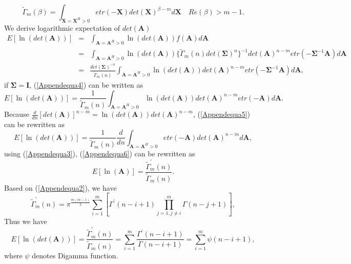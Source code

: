 \documentclass[12pt, draftclsnofoot, onecolumn]{IEEEtran}
\begin{document}
\begin{equation}
\tilde{\Gamma}_{m}(\beta)=\int_{\mathbf{X}=\mathbf{X}^{H}>0}etr(-\mathbf{X})det(\mathbf{X})^{\beta-m}d
\mathbf{X} \quad Re(\beta)>m-1.
\label{Appendequa3}
\end{equation}
We derive logarithmic expectation of $det(\mathbf{A})$
\begin{eqnarray}
\nonumber
E[\ln(det(\mathbf{A}))]&=&\int_{\mathbf{A}=\mathbf{A}^{H}>0}\ln(det(\mathbf{A}))f(\mathbf{A})d\mathbf{A}\\
\nonumber
&=&\int_{\mathbf{A}=\mathbf{A}^{H}>0}\ln(det(\mathbf{A}))\{\tilde{\Gamma}_{m}(n)det(\mathbf{\Sigma})^{n} \}^{-1}det(\mathbf{A})^{n-m}etr(-\mathbf{\Sigma}^{-1}\mathbf{A})d\mathbf{A}\\
&=&\frac{det(\mathbf{\Sigma})^{-n}}{\tilde{\Gamma}_{m}(n)}\int_{\mathbf{A}=\mathbf{A}^{H}>0}\ln(det(\mathbf{A}))det(\mathbf{A})^{n-m}etr(-\mathbf{\Sigma}^{-1}\mathbf{A})d\mathbf{A},
\label{Appendequa4}
\end{eqnarray}
if $\mathbf{\Sigma}=\mathbf{I}$, (\ref{Appendequa4}) can be written as 
\begin{equation}
E[\ln(det(\mathbf{A}))]=\frac{1}{\tilde{\Gamma}_{m}(n)}\int_{\mathbf{A}=\mathbf{A}^{H}>0}\ln(det(\mathbf{A}))det(\mathbf{A})^{n-m}etr(-\mathbf{A})d\mathbf{A}.
\label{Appendequa5}
\end{equation}
Because $\frac{d}{dn}[det(\mathbf{A})]^{n-m}=\ln(det(\mathbf{A}))det(\mathbf{A})^{n-m}$, (\ref{Appendequa5}) can be rewritten as
\begin{equation}
E[\ln(det(\mathbf{A}))]=\frac{1}{\tilde{\Gamma}_{m}(n)}\frac{d}{dn}\int_{\mathbf{A}=\mathbf{A}^{H}>0}etr(-\mathbf{A})det(\mathbf{A})^{n-m}d\mathbf{A},
\label{Appendequa6}
\end{equation}
using (\ref{Appendequa3}), (\ref{Appendequa6}) can be rewritten as 
\begin{equation}
E[\ln(\mathbf{A})]=\frac{\tilde{\Gamma}^{'}_{m}(n)}{\tilde{\Gamma}_{m}(n)}.
\label{Appendequa7}
\end{equation}
Based on (\ref{Appendequa2}), we have 
\begin{equation}
\tilde{\Gamma}^{'}_{m}(n)=\pi^{\frac{m(m-1)}{2}}\sum_{i=1}^{m}[\Gamma^{'}(n-i+1)\prod_{j=1,j\neq i }^{m}\Gamma(n-j+1)],
\end{equation}
Thus we have 
\begin{equation}
E[\ln(det(\mathbf{A}))]=\frac{\tilde{\Gamma}^{'}_{m}(n)}{\tilde{\Gamma}_{m}(n)}=\sum_{i=1}^{m}\frac{\Gamma^{'}(n-i+1)}{\Gamma(n-i+1)}=\sum_{i=1}^{m}\psi(n-i+1),
\label{Appendequa8}
\end{equation}
where $\psi$ denotes Digamma function.
\end{document}
